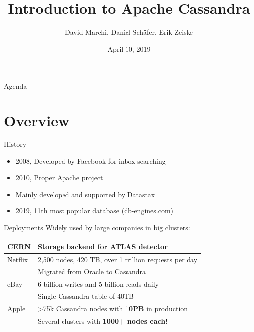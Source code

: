 \documentclass[
  10pt
]{beamer}
\title{Introduction to Apache Cassandra}
\subtitle{}
\date{April 10, 2019}
\author{David Marchi, Daniel Schäfer, Erik Zeiske}
\begin{document}
\maketitle

\begin{frame}{Agenda}
  \tableofcontents[pausesections]
\end{frame}

\section{Overview}  %

\begin{frame}{History \cite{cassandra_paper, cassandra_apache, db_engines}}
  \begin{itemize}
    \item 2008, Developed by Facebook for inbox searching
    \item 2010, Proper Apache project
    \item Mainly developed and supported by Datastax
    \item 2019, 11th most popular database (db-engines.com)
  \end{itemize}
\end{frame}

\begin{frame}{Deployments \cite{cern, netflix, ebay, ebay2, apple}}
  Widely used by large companies in big clusters:

  \begin{tabular}{@{}ll}
    \hline
    CERN    & Storage backend for ATLAS detector \\
    \hline
    Netflix & 2,500 nodes, 420 TB, over 1 trillion requests per day \\
            & Migrated from Oracle to Cassandra \\
    \hline
    eBay    & 6 billion writes and 5 billion reads daily \\
            & Single Cassandra table of 40TB \\
    \hline
    Apple   & >75k Cassandra nodes with \textbf{10PB} in production \\
            & Several clusters with \textbf{1000+ nodes each!} \\
    \hline
  \end{tabular}

\end{frame}
\end{document}
